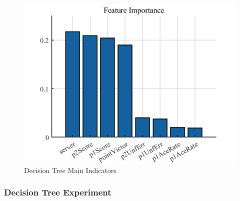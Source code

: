 \begin{figure}[bt!]
    \centering
    \includegraphics[width=0.6\linewidth]{figure/dt1.jpg}
    \caption{\centering Decision Tree Main Indicators}
    \label{fig:dt1}
\end{figure}

\subsubsection{Decision Tree Experiment}


